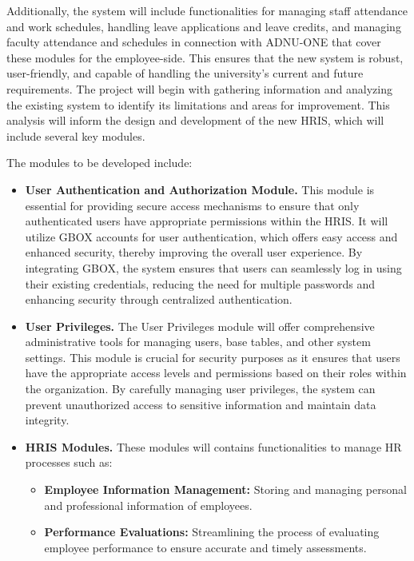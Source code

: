     Additionally, the system will include functionalities for managing staff attendance and work schedules, handling leave applications and leave credits, and managing faculty attendance and schedules in connection with ADNU-ONE that cover these modules for the employee-side. This ensures that the new system is robust, user-friendly, and capable of handling the university's current and future requirements. The project will begin with gathering information and analyzing the existing system to identify its limitations and areas for improvement. This analysis will inform the design and development of the new HRIS, which will include several key modules.
    
    The modules to be developed include:
    
    \begin{itemize}
        \item[] \textbf{User Authentication and Authorization Module.} This module is essential for providing secure access mechanisms to ensure that only authenticated users have appropriate permissions within the HRIS. It will utilize GBOX accounts for user authentication, which offers easy access and enhanced security, thereby improving the overall user experience. By integrating GBOX, the system ensures that users can seamlessly log in using their existing credentials, reducing the need for multiple passwords and enhancing security through centralized authentication.
        \item[] \textbf{User Privileges.} The User Privileges module will offer comprehensive administrative tools for managing users, base tables, and other system settings. This module is crucial for security purposes as it ensures that users have the appropriate access levels and permissions based on their roles within the organization. By carefully managing user privileges, the system can prevent unauthorized access to sensitive information and maintain data integrity.
        \item[] \textbf{HRIS Modules.} These modules will contains functionalities to manage HR processes such as:
        \begin{itemize}
            \item[] \textbf{Employee Information Management:}
            Storing and managing personal and professional information of employees.

            \item[] \textbf{Performance Evaluations: }
            Streamlining the process of evaluating employee performance to ensure accurate and timely assessments.


\end{itemize}
\end{itemize}
